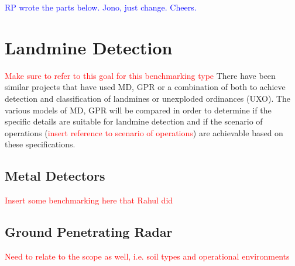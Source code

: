 \documentclass[main.tex]{subfiles}
\begin{document}

\textcolor{blue}{RP wrote the parts below. Jono, just change. Cheers. }
\section{Landmine Detection}
\textcolor{red}{Make sure to refer to this goal for this benchmarking type}
There have been similar projects that have used MD, GPR or a  combination of both to achieve detection and classification of landmines or unexploded ordinances (UXO). The various models of MD, GPR will be compared in order to determine if the specific details are suitable for landmine detection and if the scenario of operations (\textcolor{red}{insert reference to scenario of operations}) are achievable based on these specifications. 


\subsection{Metal Detectors}
\textcolor{red}{Insert some benchmarking here that Rahul did}

\subsection{Ground Penetrating Radar}
\textcolor{red}{Need to relate to the scope as well, i.e. soil types and operational environments\\}
\end{document}
